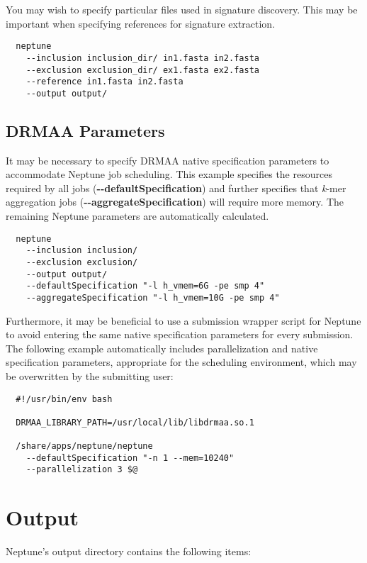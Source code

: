 \documentclass[a4paper,10pt]{article}
\begin{document}
You may wish to specify particular files used in signature discovery. This may be important when specifying references for signature extraction.

\begin{verbatim}
  neptune
    --inclusion inclusion_dir/ in1.fasta in2.fasta
    --exclusion exclusion_dir/ ex1.fasta ex2.fasta
    --reference in1.fasta in2.fasta    
    --output output/
\end{verbatim}

\subsection{DRMAA Parameters}

It may be necessary to specify DRMAA native specification parameters to accommodate Neptune job scheduling. This example specifies the resources required by all jobs (\mbox{\textbf{-{}-defaultSpecification}}) and further specifies that \textit{k}-mer aggregation jobs (\mbox{\textbf{-{}-aggregateSpecification}}) will require more memory. The remaining Neptune parameters are automatically calculated.

\begin{verbatim}
  neptune
    --inclusion inclusion/
    --exclusion exclusion/
    --output output/
    --defaultSpecification "-l h_vmem=6G -pe smp 4"
    --aggregateSpecification "-l h_vmem=10G -pe smp 4"
\end{verbatim}

Furthermore, it may be beneficial to use a submission wrapper script for Neptune to avoid entering the same native specification parameters for every submission. The following example automatically includes parallelization and native specification parameters, appropriate for the scheduling environment, which may be overwritten by the submitting user:

\begin{verbatim}
  #!/usr/bin/env bash

  DRMAA_LIBRARY_PATH=/usr/local/lib/libdrmaa.so.1

  /share/apps/neptune/neptune
    --defaultSpecification "-n 1 --mem=10240"
    --parallelization 3 $@
\end{verbatim}

\newpage
\section{Output}

Neptune's output directory contains the following items:
\end{document}
